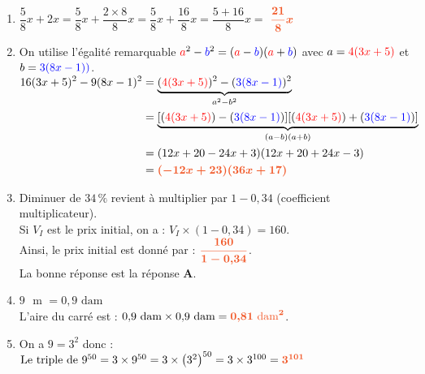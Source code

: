 \documentclass[a4paper,11pt]{article}
\newcounter{seancenum}
\newcounter{seancenumD}
\begin{document}
\setcounter{seancenumD}{25}
\newpage
\begin{seanceD}{} %

\begin{enumerate}
\item $\dfrac{5}{8}x+2x=\dfrac{5}{8}x+\dfrac{2\times8}{8}x=\dfrac{5}{8}x+\dfrac{16}{8}x=\dfrac{5+16}{8}x=$ ${\color[HTML]{f15929}\boldsymbol{\dfrac{21}{8}x}}$

\item On utilise l'égalité remarquable ${\color{red} a}^2-{\color{blue} b}^2=({\color{red} a}-{\color{blue} b})({\color{red} a}+{\color{blue} b})$ avec $a={\color{red} 4(3x+5)}$ et $b={\color{blue} 3(8x-1))}$.\\
  $\begin{aligned}16(3x+5)^2-9(8x-1)^2
  &=\underbrace{({\color{red} 4(3x+5)})^2-({\color{blue} 3(8x-1)})^2}_{a^2-b^2}\\
  &=\underbrace{[({\color{red} 4(3x+5)})-({\color{blue} 3(8x-1)})][({\color{red} 4(3x+5)})+({\color{blue} 3(8x-1)})]}_{(a-b)(a+b)}\\
  &= (12x+20-24x+3)(12x+20+24x-3)\\ &={\color[HTML]{f15929}\boldsymbol{(-12x+23)(36x+17)}}\end{aligned}$

\item Diminuer de $34\,\%$ revient à multiplier par $1 - 0{,}34$ (coefficient multiplicateur).\\
Si $V_I$ est le prix initial, on a : $ V_I \times \left(1 - 0{,}34\right)=160$.\\
Ainsi, le prix initial est donné par : ${\color[HTML]{f15929}\boldsymbol{\dfrac{160}{1 - 0{,}34}}}$.\\La bonne réponse est la réponse {\bfseries \color[HTML]{f15929}A}.

\item  $9$ $\text{ m}$ $= 0{,}9$ $\text{dam}$\\
L'aire du carré est : $0{,}9 \text{ dam}\times 0{,}9 \text{ dam} = {\color[HTML]{f15929}\boldsymbol{0{,}81\text{ dam}^2}}$.

\item On a $9=3^{2}$ donc :\\
    $
    \text{Le triple de  } 9^{50}  = 3 \times 9^{50} 
     = 3\times  \left(3^{2}\right)^{50} 
    =3\times  3^{100} 
    ={\color[HTML]{f15929}\boldsymbol{3^{101}}} 
$
   

\end{enumerate}
\end{seanceD}
\end{document}
